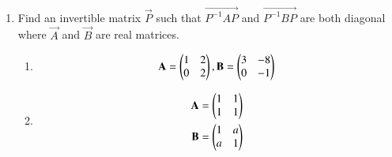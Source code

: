 \renewcommand{\theequation}{\theenumi}
\renewcommand{\thefigure}{\theenumi}
\begin{enumerate}[label=\thesubsection.\arabic*.,ref=\thesubsection.\theenumi]

\item Find an invertible matrix $\vec{P}$ such that $\vec{P^{-1}AP}$ and $\vec{P^{-1}BP}$ are both diagonal where $\vec{A}$ and $\vec{B}$ are real matrices.
%
\begin{enumerate}
\item 
\begin{align}
\Vec{A}=\myvec{1&2\\0&2} , \Vec{B}=\myvec{3&-8\\0&-1}
    \end{align}
\solution

\twocolumn
\item %
\begin{align}
    \Vec{A}=\myvec{1&1\\1&1}\\ 
    \vec{B}=\myvec{1&a\\a&1}
\end{align}
%
\\
\solution

\twocolumn
\end{enumerate}
\end{enumerate}
